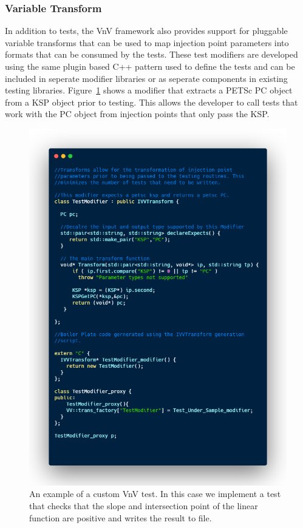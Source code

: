\subsubsection{Variable Transform}

In addition to tests, the VnV framework also provides support for pluggable variable transforms that can be used to 
map injection point parameters into formats that can be consumed by the tests. These test modifiers are developed using 
the same plugin based C++ pattern used to define the tests and can be included in seperate modifier libraries or as seperate 
components in existing testing libraries. Figure~\ref{test-mod} shows
a modifier that extracts a PETSc PC object from a KSP object prior to testing. This allows the developer to call tests that work with the PC object from
injection points that only pass the KSP. 

\begin{figure}
 \includegraphics[height=0.9\textheight, width=\textwidth]{./Figures/test-modifier.png}
 \caption{An example of a custom VnV test. In this case we implement a test that checks that the slope and intersection point of the linear function are positive and writes
 the result to file. \label{test-mod}}
\end{figure}


